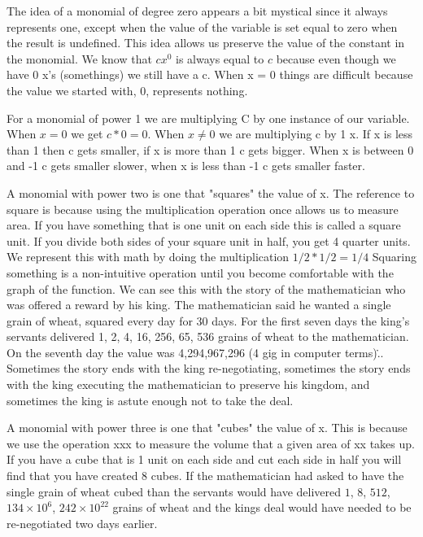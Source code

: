 The idea of a monomial of degree zero appears a bit mystical since it always represents
one, except when the value of the variable is set equal to zero when the result is
undefined. This idea allows us preserve the value of the constant in the monomial. We know
that $cx^0$ is always equal to $c$ because even though we have 0 x's (somethings) we still
have a c. When x = 0 things are difficult because the value we started with, 0, represents
nothing.



For a monomial of power 1 we are multiplying C by one instance of our variable. When $x=0$
we get $c*0=0$. When $x \ne 0$ we are multiplying c by 1 x. If x is less than 1 then c
gets smaller, if x is more than 1 c gets bigger. When x is between 0 and -1 c gets smaller
slower, when x is less than -1 c gets smaller faster.



A monomial with power two is one that "squares" the value of x. The reference to square is
because using the multiplication operation once allows us to measure area. If you have
something that is one unit on each side this is called a square unit. If you divide both
sides of your square unit in half, you get 4 quarter units. We represent this with math by
doing the multiplication $1/2 * 1/2 = 1/4$ Squaring something is a non-intuitive operation
until you become comfortable with the graph of the function. We can see this with the
story of the mathematician who was offered a reward by his king. The mathematician said he
wanted a single grain of wheat, squared every day for 30 days. For the first seven days
the king's servants delivered 1, 2, 4, 16, 256, 65, 536 grains of wheat to the
mathematician. On the seventh day the value was 4,294,967,296 (4 gig in computer
terms)\... Sometimes the story ends with the king re-negotiating, sometimes the story ends
with the king executing the mathematician to preserve his kingdom, and sometimes the king
is astute enough not to take the deal.



A monomial with power three is one that "cubes" the value of x. This is because we use the
operation x\*x\*x to measure the volume that a given area of x\*x takes up. If you have a
cube that is 1 unit on each side and cut each side in half you will find that you have
created 8 cubes. If the mathematician had asked to have the single grain of wheat cubed
than the servants would have delivered $1$, $8$, $512$, $134 \times 10^6$, $242 \times
10^{22}$ grains of wheat and the kings deal would have needed to be re-negotiated two days
earlier.




